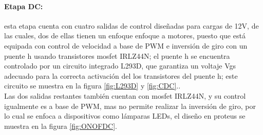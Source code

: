 %	
	
	\paragraph{Etapa DC:}
		esta etapa cuenta con cuatro salidas de control diseñadas para cargas de 12V, de las cuales, dos de ellas tienen un enfoque enfoque a motores, puesto que está equipada con control de velocidad a base de PWM e inversión de giro con un puente h usando transistores mosfet IRLZ44N; el puente h se encuentra controlado por un circuito integrado L293D, que garantiza un voltaje Vgs adecuado para la correcta activación del los transistores del puente h; este circuito se muestra en la figura \ref{fig:L293D} y \ref{fig:CDC}.\cite{IRL}.\\
		
		Las dos salidas restantes también cuentan con mosfet IRLZ44N, y su control igualmente es a base de PWM, mas no permite realizar la inversión de giro, por lo cual se enfoca a dispositivos como lámparas LEDs, el diseño en proteus se muestra en la figura \ref{fig:ONOFDC}.\\
		
%		
%	
	
